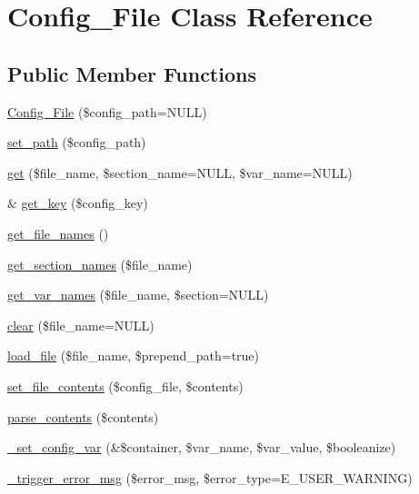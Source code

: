 \hypertarget{class_config___file}{}\section{Config\+\_\+\+File Class Reference}
\label{class_config___file}
\subsection*{Public Member Functions}
\begin{DoxyCompactItemize}
\item 
\mbox{\hyperlink{class_config___file_a0624e75e6994282d283875ba5fe6dc50}{Config\+\_\+\+File}} (\$config\+\_\+path=N\+U\+LL)
\item 
\mbox{\hyperlink{class_config___file_a739082a8fbdde8a846b4631f7e2a9427}{set\+\_\+path}} (\$config\+\_\+path)
\item 
\mbox{\hyperlink{class_config___file_adfcb0335a75e1e8d12e54d6bbe029bd6}{get}} (\$file\+\_\+name, \$section\+\_\+name=N\+U\+LL, \$var\+\_\+name=N\+U\+LL)
\item 
\& \mbox{\hyperlink{class_config___file_a748839172f7b6acec4545b1e85d8552d}{get\+\_\+key}} (\$config\+\_\+key)
\item 
\mbox{\hyperlink{class_config___file_a9b80ebae0dc9298f3bf6e2045158d54e}{get\+\_\+file\+\_\+names}} ()
\item 
\mbox{\hyperlink{class_config___file_a7d3d15a298e32cbe68ff0cbe90c5d842}{get\+\_\+section\+\_\+names}} (\$file\+\_\+name)
\item 
\mbox{\hyperlink{class_config___file_a49d583892786bedbaefb72354bfeefb7}{get\+\_\+var\+\_\+names}} (\$file\+\_\+name, \$section=N\+U\+LL)
\item 
\mbox{\hyperlink{class_config___file_a77dd43f74fb4451e1bc5dd5dafe6fb2f}{clear}} (\$file\+\_\+name=N\+U\+LL)
\item 
\mbox{\hyperlink{class_config___file_af0e6e0dd84a149b01746f06ff8d00760}{load\+\_\+file}} (\$file\+\_\+name, \$prepend\+\_\+path=true)
\item 
\mbox{\hyperlink{class_config___file_abd7d21762618afcc11eda6f28fcab261}{set\+\_\+file\+\_\+contents}} (\$config\+\_\+file, \$contents)
\item 
\mbox{\hyperlink{class_config___file_aa517a59754ad27462ee5e316aa526577}{parse\+\_\+contents}} (\$contents)
\item 
\mbox{\hyperlink{class_config___file_ae37ca20f4359111f62b05e9c18e3fce7}{\+\_\+set\+\_\+config\+\_\+var}} (\&\$container, \$var\+\_\+name, \$var\+\_\+value, \$booleanize)
\item 
\mbox{\hyperlink{class_config___file_aad61b2800c18d02db99d8e806e482dc6}{\+\_\+trigger\+\_\+error\+\_\+msg}} (\$error\+\_\+msg, \$error\+\_\+type=E\+\_\+\+U\+S\+E\+R\+\_\+\+W\+A\+R\+N\+I\+NG)
\end{DoxyCompactItemize}
